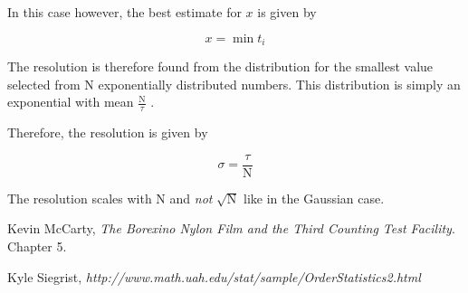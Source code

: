 \documentclass{article}
\newcommand{\N}{\mathrm{N}}
\begin{document}
In this case however, the best estimate for $x$ is given by

\[
    x = \min{t_i}
\]

The resolution is therefore found from the distribution for the smallest value
selected from $\N$ exponentially distributed numbers. This distribution is
simply an exponential with mean $\frac{\N}{\tau}$ \cite{order}.

Therefore, the resolution is given by

\[
    \sigma = \frac{\tau}{\N}
\]

The resolution scales with $\N$ and \emph{not} $\sqrt{\N}$ like in the Gaussian
case.

\begin{thebibliography}{9}
 Kevin McCarty,
\emph{The Borexino Nylon Film and the Third Counting Test Facility}.
Chapter 5.

 Kyle Siegrist,
\emph{http://www.math.uah.edu/stat/sample/OrderStatistics2.html}
\end{thebibliography}
\end{document}
